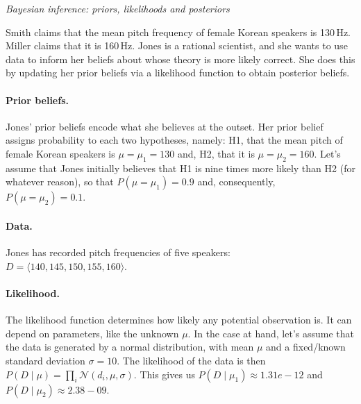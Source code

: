 \documentclass[nobib]{tufte-handout}
\begin{document}
\begin{InfoBox}[]
\centering
\colorbox{mygray}{\centering
  \begin{minipage}{1.0\textwidth}

    \emph{Bayesian inference: priors, likelihoods and posteriors}
    \medskip

    Smith claims that the mean pitch frequency of female Korean speakers is 130\,Hz. Miller claims that it is 160\,Hz. Jones is a rational scientist, and she wants to use data to inform her beliefs about whose theory is more likely correct. She does this by updating her prior beliefs via a likelihood function to obtain posterior beliefs.    
   
    \paragraph{Prior beliefs.} Jones' prior beliefs encode what she believes at the outset. Her prior belief assigns probability to each two hypotheses, namely: H1, that the mean pitch of female Korean speakers is $\mu = \mu_1 = 130$ and, H2, that it is $\mu = \mu_2 = 160$. Let's assume that Jones initially believes that H1 is nine times more likely than H2 (for whatever reason), so that $P(\mu = \mu_1) = 0.9$ and, consequently, $P(\mu = \mu_2) = 0.1$.

    \paragraph{Data.} Jones has recorded pitch frequencies of five speakers: \\ $D = \langle 140, 145, 150, 155, 160 \rangle$.
    
    \paragraph{Likelihood.} The likelihood function determines how likely any potential
    observation is. It can depend on parameters, like the unknown $\mu$. In the case at hand,
    let's assume that the data is generated by a normal distribution, with mean $\mu$ and a
    fixed/known standard deviation $\sigma = 10$. The likelihood of the data is then $P(D \mid
    \mu) = \prod_{i} \mathcal{N}(d_i, \mu, \sigma)$. This gives us $P(D \mid \mu_1) \approx
    1.31e-12$ and $P(D \mid \mu_2) \approx 2.38-09$.


\end{minipage}}
\end{InfoBox}
\end{document}
